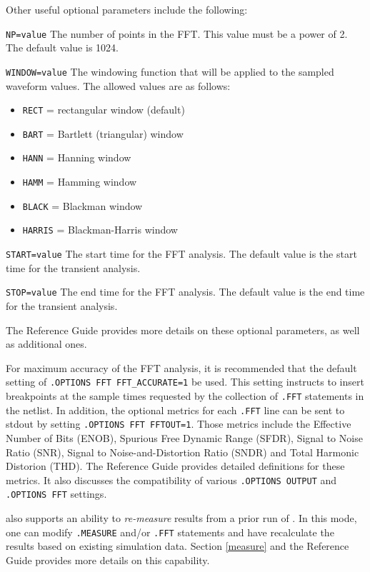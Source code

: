 Other useful optional parameters include the following:
\begin{XyceItemize}
  \item{\texttt{NP=value}} The number of points in the FFT.  This value must be a power of 2.
     The default value is 1024.
  \item{\texttt{WINDOW=value}} The windowing function that will be applied to the sampled waveform
values.  The allowed values are as follows:
    \begin{itemize}
      \item \texttt{RECT} = rectangular window (default)
      \item \texttt{BART} = Bartlett (triangular) window
      \item \texttt{HANN} = Hanning window
      \item \texttt{HAMM} = Hamming window
      \item \texttt{BLACK} = Blackman window
      \item \texttt{HARRIS} = Blackman-Harris window
    \end{itemize}
  \item{\texttt{START=value}} The start time for the FFT analysis. The default value is the
start time for the transient analysis.
  \item{\texttt{STOP=value}} The end time for the FFT analysis. The default value is the
end time for the transient analysis.
\end{XyceItemize}

The \Xyce{} Reference Guide\ReferenceGuide{} provides more details on these
optional parameters, as well as additional ones.

For maximum accuracy of the FFT analysis, it is recommended that the default
setting of \texttt{.OPTIONS FFT FFT\_ACCURATE=1} be used.  This setting instructs
\Xyce{} to insert breakpoints at the sample times requested by the collection of
\texttt{.FFT} statements in the netlist.  In addition, the optional metrics for
each \texttt{.FFT} line can be sent to stdout by setting \texttt{.OPTIONS FFT FFTOUT=1}.
Those metrics include the Effective Number of Bits (ENOB), Spurious Free Dynamic
Range (SFDR), Signal to Noise Ratio (SNR), Signal to Noise-and-Distortion Ratio (SNDR)
and Total Harmonic Distorion (THD).  The \Xyce{} Reference Guide\ReferenceGuide{}
provides detailed definitions for these metrics.  It also discusses the compatibility
of various \texttt{.OPTIONS OUTPUT} and \texttt{.OPTIONS FFT} settings.

\Xyce{} also supports an ability to {\it re-measure} results from a prior run of \Xyce{}.
In this mode, one can modify \texttt{.MEASURE} and/or \texttt{.FFT} statements and have
\Xyce{} recalculate the results based on existing simulation data.  Section \ref{measure}
and the \Xyce{} Reference Guide\ReferenceGuide{} provides more details on this capability.

